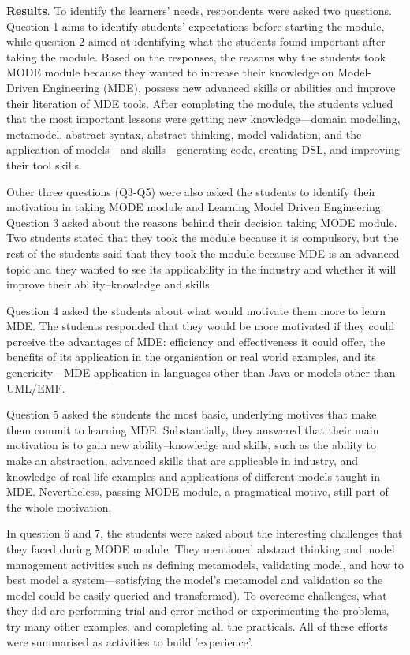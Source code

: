 \documentclass[12pt, a4paper]{report} \usepackage[titletoc]{appendix}
\begin{document}
\begin{appendices}
\textbf{Results}. To identify the learners' needs, respondents were asked two questions. Question 1 aims to identify students' expectations before starting the module, while question 2 aimed at identifying what the students found important after taking the module. Based on the responses, the reasons why the students took MODE module because they wanted to increase their knowledge on Model-Driven Engineering (MDE), possess new advanced skills or abilities and improve their literation of MDE tools. After completing the module, the students valued that the most important lessons were getting new knowledge---domain modelling, metamodel, abstract syntax, abstract thinking, model validation, and the application of models---and skills---generating code, creating DSL, and improving their tool skills. 

Other three questions (Q3-Q5) were also asked the students to identify their motivation in taking MODE module and Learning Model Driven Engineering. Question 3 asked about the reasons behind their decision taking MODE module. Two students stated that they took the module because it is compulsory, but the rest of the students said that they took the module because MDE is an advanced topic and they wanted to see its applicability in the industry and whether it will improve their ability--knowledge and skills.

Question 4 asked the students about what would motivate them more to learn MDE. The students responded that they would be more motivated if they could perceive the advantages of MDE: efficiency and effectiveness it could offer, the benefits of its application in the organisation or real world examples, and its genericity---MDE application in languages other than Java or models other than UML/EMF.

Question 5 asked the students the most basic, underlying motives that make them commit to learning MDE. Substantially, they answered that their main motivation is to gain new ability--knowledge and skills, such as the ability to make an abstraction, advanced skills that are applicable in industry, and knowledge of real-life examples and applications of different models taught in MDE. Nevertheless, passing MODE module, a pragmatical motive, still part of the whole motivation. 

In question 6 and 7, the students were asked about the interesting challenges that they faced during MODE module. They mentioned abstract thinking and model management activities such as defining metamodels, validating model, and how to best model a system---satisfying the model's metamodel and validation so the model could be easily queried and transformed). To overcome challenges, what they did are performing trial-and-error method or experimenting the problems, try many other examples, and completing all the practicals. All of these efforts were summarised as activities to build 'experience'.


\end{appendices}
\end{document}
